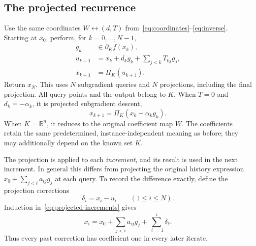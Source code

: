 \documentclass[11pt]{article}
\numberwithin{equation}{section}
\theoremstyle{definition}
\newcommand{\R}{\mathbb R}
\begin{document}
\subsection{The projected recurrence}
Use the same coordinates $W\leftrightarrow(d,T)$ from~\eqref{eq:coordinates}--\eqref{eq:inverse}. Starting at $x_0$, perform, for $k=0,\ldots,N-1$,
\begin{align}
 g_k&\in\partial_K f(x_k),\nonumber\\
 u_{k+1}&=x_k+d_kg_k+\sum_{j<k}T_{kj}g_j,\label{eq:projected-increments}\\
 x_{k+1}&=\Pi_K(u_{k+1}).\nonumber
\end{align}
Return $x_N$. This uses $N$ subgradient queries and $N$ projections, including the final projection. All query points and the output belong to $K$. When $T=0$ and $d_k=-\alpha_k$, it is projected subgradient descent,
\[
 x_{k+1}=\Pi_K(x_k-\alpha_kg_k).
\]
When $K=\R^n$, it reduces to the original coefficient map $W$. The coefficients retain the same predetermined, instance-independent meaning as before; they may additionally depend on the known set $K$.

The projection is applied to each \emph{increment}, and its result is used in the next increment. In general this differs from projecting the original history expression $x_0+\sum_{j<i}a_{ij}g_j$ at each query. To record the difference exactly, define the projection corrections
\[
 \delta_i=x_i-u_i\qquad(1\le i\le N).
\]
Induction in~\eqref{eq:projected-increments} gives
\begin{equation}
 x_i=x_0+\sum_{j<i}a_{ij}g_j+\sum_{\ell=1}^{i}\delta_\ell.
 \label{eq:projected-history}
\end{equation}
Thus every past correction has coefficient one in every later iterate.
\end{document}
